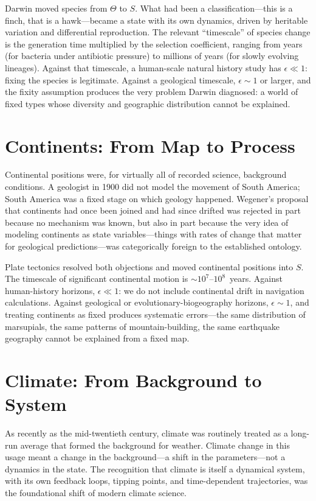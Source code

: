 \documentclass[11pt]{book}
\theoremstyle{plain}
\theoremstyle{definition}
\theoremstyle{remark}
\begin{document}
Darwin moved species from $\Theta$ to $S$. What had been a classification---this is a finch, that is a hawk---became a state with its own dynamics, driven by heritable variation and differential reproduction. The relevant ``timescale'' of species change is the generation time multiplied by the selection coefficient, ranging from years (for bacteria under antibiotic pressure) to millions of years (for slowly evolving lineages). Against that timescale, a human-scale natural history study has $\epsilon \ll 1$: fixing the species is legitimate. Against a geological timescale, $\epsilon \sim 1$ or larger, and the fixity assumption produces the very problem Darwin diagnosed: a world of fixed types whose diversity and geographic distribution cannot be explained.

\section{Continents: From Map to Process}

Continental positions were, for virtually all of recorded science, background conditions. A geologist in 1900 did not model the movement of South America; South America was a fixed stage on which geology happened. Wegener's proposal that continents had once been joined and had since drifted was rejected in part because no mechanism was known, but also in part because the very idea of modeling continents as state variables---things with rates of change that matter for geological predictions---was categorically foreign to the established ontology.

Plate tectonics resolved both objections and moved continental positions into $S$. The timescale of significant continental motion is $\sim 10^7$--$10^8$~years. Against human-history horizons, $\epsilon \ll 1$: we do not include continental drift in navigation calculations. Against geological or evolutionary-biogeography horizons, $\epsilon \sim 1$, and treating continents as fixed produces systematic errors---the same distribution of marsupials, the same patterns of mountain-building, the same earthquake geography cannot be explained from a fixed map.

\section{Climate: From Background to System}

As recently as the mid-twentieth century, climate was routinely treated as a long-run average that formed the background for weather. Climate change in this usage meant a change in the background---a shift in the parameters---not a dynamics in the state. The recognition that climate is itself a dynamical system, with its own feedback loops, tipping points, and time-dependent trajectories, was the foundational shift of modern climate science.
\end{document}
